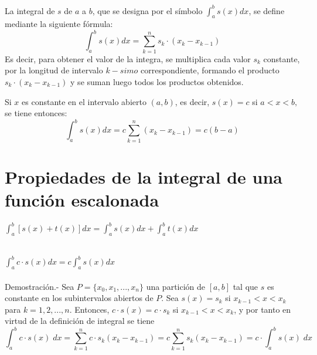     \begin{tcolorbox}[colframe = white]
	\begin{def.}
	    La integral de $s$ de $a$ a $b$, que se designa por el símbolo $\int_{a}^{b} s(x) dx$, se define mediante la siguiente fórmula: $$\int_{a}^{b} s(x) dx = \sum\limits_{k=1}^{n} s_k \cdot (x_k - x_{k-1})$$
	    Es decir, para obtener el valor de la integra, se multiplica cada valor $s_k$ constante, por la longitud de intervalo $k-simo$ correspondiente, formando el producto $s_k\cdot (x_k - x_{k-1})$ y se suman luego todos los productos obtenidos.
	\end{def.}
    \end{tcolorbox}

    \begin{tcolorbox}[colframe = white]
	\begin{def.}
	    Si $x$ es constante en el intervalo abierto $(a,b)$, es decir, $s(x)=c$ si $a<x<b,$ se tiene entonces: $$\int_{a}^{b} s(x) dx = c \sum\limits_{k=1}^{n} (x_k - x_{k-1}) = c(b-a)$$
	\end{def.}
    \end{tcolorbox}

\section{Propiedades de la integral de una función escalonada}

    \begin{teo}
	$\displaystyle\int_{a}^{b} [s(x) + t(x)] dx = \int_{a}^{b} s(x) dx + \int_{a}^{b} t(x) dx$\\\\
    \end{teo}

    \begin{teo}
	$\displaystyle\int_{a}^{b} c \cdot s(x) dx = c\int_{a}^{b} s(x) dx$\\\\
	    Demostración.-\; Sea $P=\lbrace x_0,x_1,...,x_n \rbrace$ una partición de $[a,b]$ tal que $s$ es constante en los subintervalos abiertos de $P$. Sea $s(x)=s_k$ si $x_{k-1}<x<x_k$ para $k=1,2,...,n$. Entonces, $c \cdot s(x) = c \cdot s_k$ si $x_{k-1}<x<x_k$, y por tanto en virtud de la definición de integral se tiene $$\displaystyle\int_{a}^{b} c\cdot s(x) \; dx = \sum\limits_{k=1}^n c \cdot s_k (x_k - x_{k-1}) = c \sum\limits_{k=1}^n s_k(x_k - x_{k-1}) = c\cdot \int_{a}^{b} s(x) \; dx$$\\
    \end{teo}

